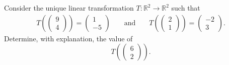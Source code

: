 \documentclass[12pt]{article}
\newenvironment{problem}[2][Problem]
{
	\begin{trivlist} 
		\item[\hskip \labelsep {\bfseries #1 #2:}]
	}
{
	\end{trivlist}
	}
\begin{document}
\begin{problem}{1}
Consider the unique linear transformation $T:\mathbb{R}^2 \to \mathbb{R}^2$ such that
\begin{align*}
T\left(\begin{pmatrix}9\\4\end{pmatrix}\right)=\begin{pmatrix}1\\-5\end{pmatrix} && \text{ and } && T\left(\begin{pmatrix}2\\1\end{pmatrix}\right)=\begin{pmatrix}-2\\3\end{pmatrix}\text{.}
\end{align*}
Determine, with explanation, the value of
\[
T\left(\begin{pmatrix}6\\2\end{pmatrix}\right)\text{.}
\]
\noindent
\newline
\newline


\end{problem}
\end{document}
